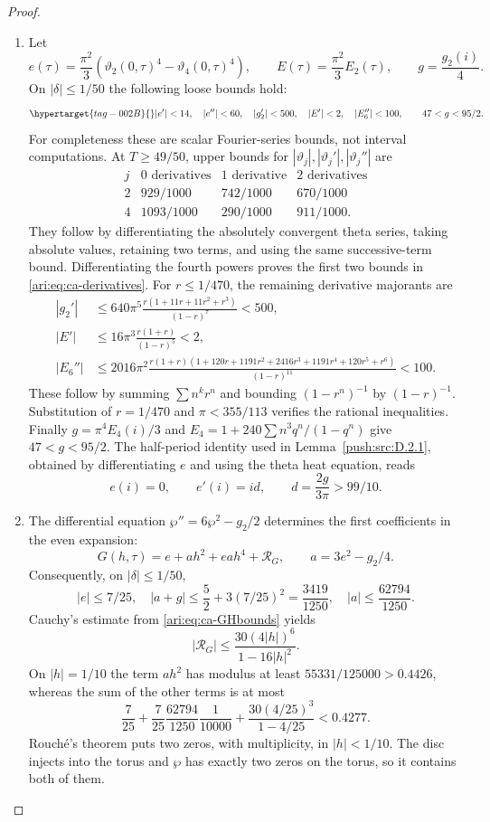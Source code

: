 \begin{proof}
\begin{enumerate}[label=\arabic*.,leftmargin=*]
\item Let
\[
 e(\tau)=\frac{\pi^2}{3}(\vartheta_2(0,\tau)^4-
                              \vartheta_4(0,\tau)^4),\qquad
 E(\tau)=\frac{\pi^2}{3}E_2(\tau),\qquad
 g=\frac{g_2(i)}4.
\]
On $|\delta|\le1/50$ the following loose bounds hold:
\begin{equation}\hypertarget{tag-002B}{}\label{ari:eq:ca-derivatives}
 |e'|<14,\quad |e''|<60,\quad |g_2'|<500,
 \quad |E'|<2,\quad |E_6''|<100,
 \qquad 47<g<95/2.
\end{equation}
For completeness these are scalar Fourier-series bounds, not
interval computations. At $T\ge49/50$, upper bounds for
$|\vartheta_j|,|\vartheta_j'|,|\vartheta_j''|$ are
\[
\begin{array}{c|ccc}
j&0\text{ derivatives}&1\text{ derivative}&2\text{ derivatives}\\ \hline
2&929/1000&742/1000&670/1000\\
4&1093/1000&290/1000&911/1000.
\end{array}
\]
They follow by differentiating the absolutely convergent theta
series, taking absolute values, retaining two terms, and using
the same successive-term bound. Differentiating the fourth
powers proves the first two bounds in \eqref{ari:eq:ca-derivatives}.
For $r\le1/470$, the remaining derivative majorants are
\begin{align*}
 |g_2'|&\le640\pi^5\frac{r(1+11r+11r^2+r^3)}{(1-r)^7}<500,\\
 |E'|&\le16\pi^3\frac{r(1+r)}{(1-r)^5}<2,\\
 |E_6''|&\le2016\pi^2
 \frac{r(1+r)(1+120r+1191r^2+2416r^3+1191r^4+120r^5+r^6)}
 {(1-r)^{11}}<100.
\end{align*}
These follow by summing $\sum n^k r^n$ and bounding
$(1-r^n)^{-1}$ by $(1-r)^{-1}$. Substitution of $r=1/470$
and $\pi<355/113$ verifies the rational inequalities.
Finally $g=\pi^4E_4(i)/3$ and
$E_4=1+240\sum n^3q^n/(1-q^n)$ give $47<g<95/2$.
The half-period identity used in Lemma~\ref{push:src:D.2.1},
obtained by differentiating $e$ and using the theta heat equation, reads
\[
 e(i)=0,\qquad e'(i)=id,\qquad d=\frac{2g}{3\pi}>99/10.
\]

\item The differential equation $\wp''=6\wp^2-g_2/2$ determines the
first coefficients in the even expansion:
\[
 G(h,\tau)=e+a h^2+ea h^4+\mathcal R_G,
 \qquad a=3e^2-g_2/4.
\]
Consequently, on $|\delta|\le1/50$,
\[
 |e|\le7/25,\quad |a+g|\le\frac52+3(7/25)^2=\frac{3419}{1250},
 \quad |a|\le\frac{62794}{1250}.
\]
Cauchy's estimate from \eqref{ari:eq:ca-GHbounds} yields
\[
 |\mathcal R_G|\le
 \frac{30(4|h|)^6}{1-16|h|^2}.
\]
On $|h|=1/10$ the term $ah^2$ has modulus at least
$55331/125000>0.4426$, whereas the sum of the other terms is at most
\[
 \frac7{25}+\frac7{25}\frac{62794}{1250}\frac1{10000}
       +\frac{30(4/25)^3}{1-4/25}<0.4277.
\]
Rouch\'e's theorem puts two zeros, with multiplicity, in
$|h|<1/10$. The disc injects into the torus and $\wp$ has exactly
two zeros on the torus, so it contains both of them.


\end{enumerate}
\end{proof}
